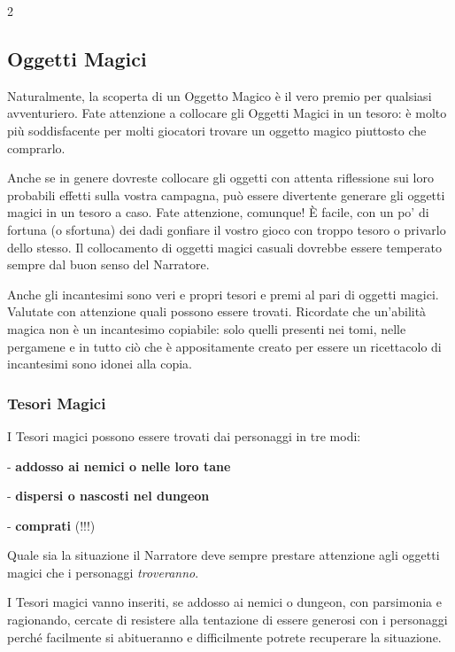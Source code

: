 \begin{multicols}{2}
\subsection{Oggetti Magici}

Naturalmente, la scoperta di un Oggetto Magico è il vero premio per qualsiasi avventuriero. Fate attenzione a collocare gli Oggetti Magici in un tesoro: è molto più soddisfacente per molti giocatori trovare un oggetto magico piuttosto che comprarlo.

Anche se in genere dovreste collocare gli oggetti con attenta riflessione sui loro probabili effetti sulla vostra campagna, può essere divertente generare gli oggetti magici in un tesoro a caso. Fate attenzione, comunque! È facile, con un po' di fortuna (o sfortuna) dei dadi gonfiare il vostro gioco con troppo tesoro o privarlo dello stesso. Il collocamento di oggetti magici casuali dovrebbe essere temperato sempre dal buon senso del Narratore.

Anche gli incantesimi sono veri e propri tesori e premi al pari di oggetti magici. Valutate con attenzione quali possono essere trovati. Ricordate che un'abilità magica non è un incantesimo copiabile: solo quelli presenti nei tomi, nelle pergamene e in tutto ciò che è appositamente creato per essere un ricettacolo di incantesimi sono idonei alla copia.

\subsubsection{Tesori Magici}\label{tesorimagici}

I Tesori magici possono essere trovati dai personaggi in tre modi:

\medskip

- \textbf{addosso ai nemici o nelle loro tane}

- \textbf{dispersi o nascosti nel dungeon}

- \textbf{comprati} (!!!)

\medskip

Quale sia la situazione il Narratore deve sempre prestare attenzione agli oggetti magici che i personaggi \emph{troveranno}.

I Tesori magici vanno inseriti, se addosso ai nemici o dungeon, con parsimonia e ragionando, cercate di resistere alla tentazione di essere generosi con i personaggi perché facilmente si abitueranno e difficilmente potrete recuperare la situazione.


\end{multicols}

